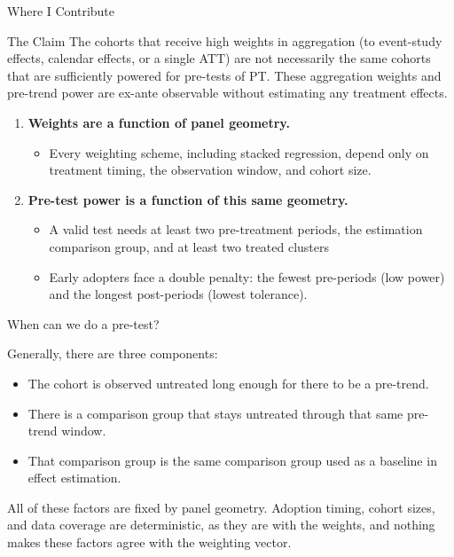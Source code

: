 \documentclass[11pt]{beamer}
\begin{document}
\begin{frame}{Where I Contribute}
    \begin{alertblock}{The Claim}
        The cohorts that receive high weights in aggregation (to event-study effects, calendar effects, or a single ATT) are not necessarily the same cohorts that are sufficiently powered for pre-tests of PT. These aggregation weights and pre-trend power are ex-ante observable without estimating any treatment effects.
    \end{alertblock}
    \begin{enumerate}
        \item \textbf{Weights are a function of panel geometry.}
        \begin{itemize}
            \item Every weighting scheme, including stacked regression, depend only on treatment timing, the observation window, and cohort size.
        \end{itemize}
        \item \textbf{Pre-test power is a function of this same geometry.}
        \begin{itemize}
            \item A valid test needs at least two pre-treatment periods, the estimation comparison group, and at least two treated clusters
            \item Early adopters face a double penalty: the fewest pre-periods (low power) and the longest post-periods (lowest tolerance).
        \end{itemize}
    \end{enumerate}
\end{frame}

\begin{frame}{When can we do a pre-test?}

Generally, there are three components:
    \begin{itemize}
        \item The cohort is observed untreated long enough for there to be a pre-trend.
        \item There is a comparison group that stays untreated through that same pre-trend window.
        \item That comparison group is the same comparison group used as a baseline in effect estimation.
    \end{itemize}


    All of these factors are fixed by panel geometry. Adoption timing, cohort sizes, and data coverage are deterministic, as they are with the weights, and nothing makes these factors agree with the weighting vector.

\end{frame}
\end{document}
